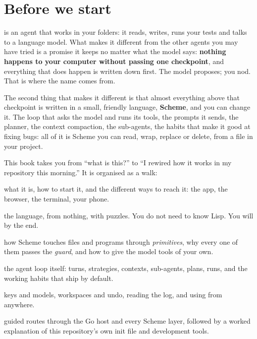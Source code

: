 \chapter*{Before we start}

\nodwyn{} is an agent that works in your folders: it reads, writes, runs your
tests and talks to a language model. What makes it different from the other
agents you may have tried is a promise it keeps no matter what the model says:
\textbf{nothing happens to your computer without passing one checkpoint}, and
everything that does happen is written down first. The model proposes; you
nod. That is where the name comes from.

The second thing that makes it different is that almost everything above that
checkpoint is written in a small, friendly language, \textbf{Scheme}, and you
can change it. The loop that asks the model and runs its tools, the prompts
it sends, the planner, the context compaction, the sub-agents, the habits
that make it good at fixing bugs: all of it is Scheme you can read, wrap,
replace or delete, from a file in your project.

This book takes you from ``what is this?'' to ``I rewired how it works in my
repository this morning.'' It is organised as a walk:

\begin{description}[leftmargin=1.2em,labelindent=0pt]
  \item[Part I, Meeting nodwyn] what it is, how to start it, and the
    different ways to reach it: the app, the browser, the terminal, your
    phone.
  \item[Part II, Scheme, the Fun Part] the language, from nothing, with
    puzzles. You do not need to know Lisp. You will by the end.
  \item[Part III, Scheme Meets the World] how Scheme touches files and
    programs through \emph{primitives}, why every one of them passes the
    \emph{guard}, and how to give the model tools of your own.
  \item[Part IV, Steering the Loop] the agent loop itself: turns,
    strategies, contexts, sub-agents, plans, runs, and the working habits
    that ship by default.
  \item[Part V, Operating Like an Expert] keys and models, workspaces and
    undo, reading the log, and using \nodwyn{} from anywhere.
  \item[The implementation map, Part~\ref{part:source-map}] guided routes
    through the Go host and every Scheme layer, followed by a worked
    explanation of this repository's own init file and development tools.
\end{description}

